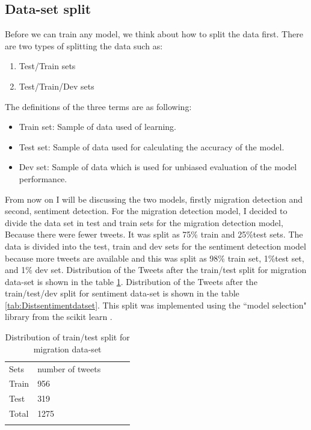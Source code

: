 \subsection{Data-set split}
Before we can train any model, we think about how to split the data first. There are two types of splitting the data such as:
\begin{enumerate}
    \item Test/Train sets
  \item Test/Train/Dev sets
\end{enumerate}
The definitions of the three terms are as following:
\begin{itemize}
     \item Train set: Sample of data used of learning.
 
    \item Test set: Sample of data used for calculating the accuracy of the model.
      \item Dev set: Sample of data which is used for unbiased evaluation of the model performance.
\end{itemize}

From now on I will be discussing the two models, firstly migration detection and second, sentiment detection. For the migration detection model, I decided to divide the data set in test and train sets for the migration detection model, Because there were fewer tweets. It was split as 75\% train and 25\%test sets. The data is divided into the test, train and dev sets for the sentiment detection model because more tweets are available and this was split as 98\% train set, 1\%test set, and 1\% dev set.
Distribution of the Tweets after the train/test split for migration data-set is shown in the table \ref{tab:Distmigrationdataset}. Distribution of the Tweets after the train/test/dev split for sentiment data-set is shown in the table \ref{tab:Distsentimentdatset}. This split was implemented using the ``model selection" library from the scikit learn \cite{scikit-learn}.


\begin{table}[]
\centering
\begin{tabular}{lllll}
\cline{1-2}
\multicolumn{1}{|l|}{Sets}   & \multicolumn{1}{l|}{number of tweets} &  &  &  \\ \cline{1-2}
\multicolumn{1}{|l|}{Train} & \multicolumn{1}{l|}{956}  &  &  &  \\ \cline{1-2}
\multicolumn{1}{|l|}{Test} & \multicolumn{1}{l|}{319}  &  &  &  \\ \cline{1-2}
\multicolumn{1}{|l|}{Total}   & \multicolumn{1}{l|}{1275}  &  &  &  \\ \cline{1-2}
                            &                           &  &  & 
\label{tab:Distribution of sentiment class}
\end{tabular}
\caption{Distribution of train/test split for migration data-set}
\label{tab:Distmigrationdataset}
\end{table}

